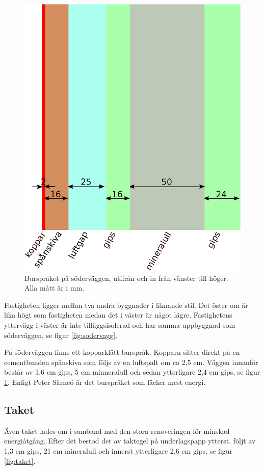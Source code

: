 \begin{figure}[hpbt]
\centering
\includegraphics[width=0.3\textheight]{images/bursprak.eps}
\caption{\label{fig:bursprak}{Burspråket på söderväggen, utifrån och in från vänster till höger. Alla mått är i mm.}}
\end{figure}

Fastigheten ligger mellan två andra byggnader i liknande stil. Det öster om är lika högt som fastigheten medan det i väster är något lägre. Fastighetens yttervägg i väster är inte tilläggsisolerad och har samma uppbyggnad som söderväggen, se figur \ref{fig:sodervagg}.

På söderväggen finns ett kopparklätt burspråk. Kopparn sitter direkt på en cementbunden spånskiva som följs av en luftspalt om ca 2,5 cm. Väggen innanför består av 1,6 cm gips, 5 cm minneralull och sedan ytterligare 2,4 cm gips, se figur \ref{fig:bursprak}.\cite{kandidatarbete2010} Enligt Peter Särneö\cite{petersarneo} är det burspråket som läcker mest energi.


\subsection{Taket}
Även taket lades om i samband med den stora renoveringen för minskad energiåtgång. Efter det bestod det av taktegel på underlagspapp ytterst, följt av 1,3 cm gips, 21 cm mineralull och innerst ytterligare 2,6 cm gips, se figur \ref{fig:taket}.\cite{kandidatarbete2010}

